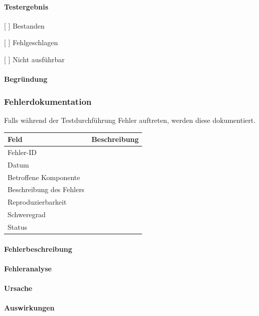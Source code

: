 \paragraph{Testergebnis}\label{testergebnis}

{[} {]} Bestanden

{[} {]} Fehlgeschlagen

{[} {]} Nicht ausführbar

\paragraph{Begründung}\label{begruxfcndung}

\subsubsection{Fehlerdokumentation}\label{fehlerdokumentation}

Falls während der Testdurchführung Fehler auftreten, werden diese
dokumentiert.

\begin{longtable}[]{@{}ll@{}}
\toprule\noalign{}
Feld & Beschreibung \\
\midrule\noalign{}
\endhead
\bottomrule\noalign{}
\endlastfoot
Fehler-ID & \\
Datum & \\
Betroffene Komponente & \\
Beschreibung des Fehlers & \\
Reproduzierbarkeit & \\
Schweregrad & \\
Status & \\
\end{longtable}

\paragraph{Fehlerbeschreibung}\label{fehlerbeschreibung}

\paragraph{Fehleranalyse}\label{fehleranalyse-1}

\paragraph{Ursache}\label{ursache}

\paragraph{Auswirkungen}\label{auswirkungen}


